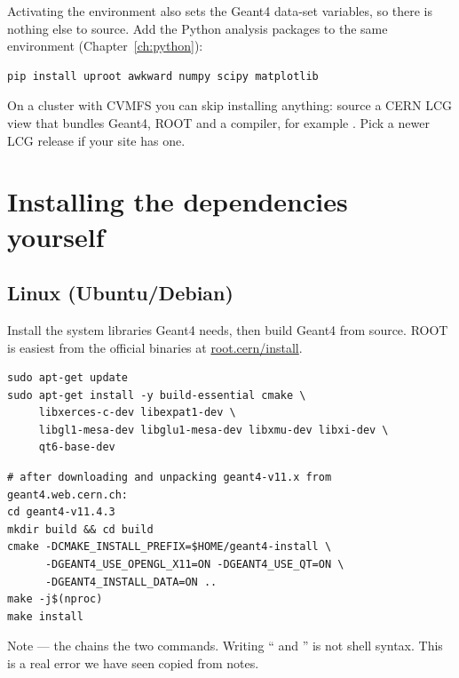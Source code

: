 Activating the environment also sets the Geant4 data-set variables, so there is nothing else to source. Add the Python analysis packages to the same environment (Chapter~\ref{ch:python}):

\begin{lstlisting}[style=sh,caption={Analysis packages}]
pip install uproot awkward numpy scipy matplotlib
\end{lstlisting}

\begin{tip}
On a cluster with CVMFS you can skip installing anything: source a CERN LCG view that bundles Geant4, ROOT and a compiler, for example . Pick a newer LCG release if your site has one.
\end{tip}

\section{Installing the dependencies yourself}
\subsection{Linux (Ubuntu/Debian)}
Install the system libraries Geant4 needs, then build Geant4 from source. ROOT is easiest from the official binaries at \url{root.cern/install}.

\begin{lstlisting}[style=sh,caption={System build dependencies}]
sudo apt-get update
sudo apt-get install -y build-essential cmake \
     libxerces-c-dev libexpat1-dev \
     libgl1-mesa-dev libglu1-mesa-dev libxmu-dev libxi-dev \
     qt6-base-dev
\end{lstlisting}

\begin{lstlisting}[style=sh,caption={Build Geant4 11 from source}]
# after downloading and unpacking geant4-v11.x from geant4.web.cern.ch:
cd geant4-v11.4.3
mkdir build && cd build
cmake -DCMAKE_INSTALL_PREFIX=$HOME/geant4-install \
      -DGEANT4_USE_OPENGL_X11=ON -DGEANT4_USE_QT=ON \
      -DGEANT4_INSTALL_DATA=ON ..
make -j$(nproc)
make install
\end{lstlisting}

\begin{pitfall}
Note  --- the \code{&&} chains the two commands. Writing `` and '' is not shell syntax. This is a real error we have seen copied from notes.
\end{pitfall}


